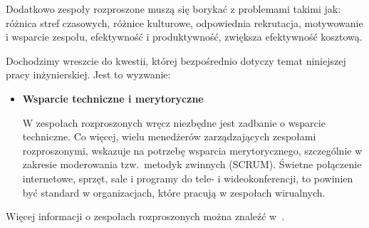 Dodatkowo zespoły rozproszone muszą się borykać z problemami takimi jak: różnica stref czasowych,
różnice kulturowe, odpowiednia rekrutacja, motywowanie i wsparcie zespołu, efektywność i produktywność,
zwiększa efektywność kosztową.

Dochodzimy wreszcie do kwestii, której bezpośrednio dotyczy temat niniejszej pracy inżynierskiej.
Jest to wyzwanie:

\begin{itemize}
	\item \textbf{Wsparcie techniczne i merytoryczne}

	W zespołach rozproszonych wręcz niezbędne jest zadbanie o wsparcie techniczne.
	Co więcej, wielu menedżerów zarządzających zespołami rozproszonymi,
	wskazuje na potrzebę wsparcia merytorycznego,
	szczególnie w zakresie moderowania tzw.\ metodyk zwinnych (SCRUM).
	Świetne połączenie internetowe,	sprzęt, sale i programy do tele- i wideokonferencji,
	to powinien być standard w organizacjach, które pracują w zespołach wirualnych.
\end{itemize}


Więcej informacji o zespołach rozproszonych można znaleźć w~\cite{www_rozproszony}.
